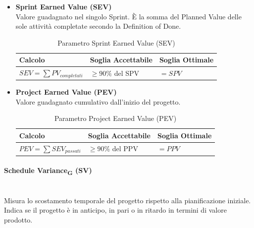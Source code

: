\documentclass[11pt,a4paper]{article}
\begin{document}
\begin{itemize}
    \item \textbf{Sprint Earned Value (SEV)} \\
    Valore guadagnato nel singolo Sprint. È la somma del Planned Value delle sole attività completate secondo la Definition of Done.
    
    \begin{table}[H]
        \centering
        \renewcommand{\arraystretch}{1.5}
        \begin{tabular}{|M{0.4\textwidth}|M{0.25\textwidth}|M{0.25\textwidth}|}
            \hline
            \textbf{Calcolo} & \textbf{Soglia Accettabile} & \textbf{Soglia Ottimale} \\
            \hline
            $SEV = \sum PV_{completati}$ & $\ge 90\%$ del SPV & $= SPV$ \\
            \hline
        \end{tabular}
        \caption{Parametro Sprint Earned Value (SEV)}
    \end{table}

    \item \textbf{Project Earned Value (PEV)} \\
    Valore guadagnato cumulativo dall'inizio del progetto.
    
    \begin{table}[H]
        \centering
        \renewcommand{\arraystretch}{1.5}
        \begin{tabular}{|M{0.4\textwidth}|M{0.25\textwidth}|M{0.25\textwidth}|}
            \hline
            \textbf{Calcolo} & \textbf{Soglia Accettabile} & \textbf{Soglia Ottimale} \\
            \hline
            $PEV = \sum SEV_{passati}$ & $\ge 90\%$ del PPV & $= PPV$ \\
            \hline
        \end{tabular}
        \caption{Parametro Project Earned Value (PEV)}
    \end{table}
\end{itemize}


\paragraph{Schedule Variance\textsubscript{G} (SV)} \hfill \\
Misura lo scostamento temporale del progetto rispetto alla pianificazione iniziale. Indica se il progetto è in anticipo, in pari o in ritardo in termini di valore prodotto.
\end{document}
